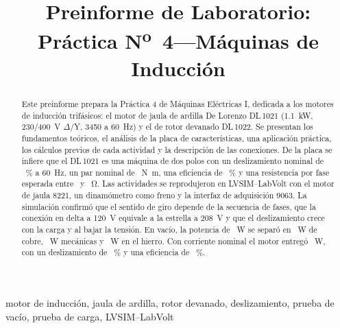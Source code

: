 \documentclass[conference]{IEEEtran}
\begin{document}
\title{Preinforme de Laboratorio: Práctica N\textsuperscript{o}~4---Máquinas de Inducción}

\author{
}

\maketitle

\begin{abstract}
Este preinforme prepara la Práctica 4 de Máquinas Eléctricas I, dedicada a los motores de inducción trifásicos: el motor de jaula de ardilla De Lorenzo DL\,1021 (\SI{1,1}{kW}, \num{230}/\SI{400}{V} $\Delta$/Y, \SI{3450}{\rpm} a \SI{60}{Hz}) y el de rotor devanado DL\,1022. Se presentan los fundamentos teóricos, el análisis de la placa de características, una aplicación práctica, los cálculos previos de cada actividad y la descripción de las conexiones. De la placa se infiere que el DL\,1021 es una máquina de dos polos con un deslizamiento nominal de \DLsSes~\% a \SI{60}{Hz}, un par nominal de \DLTsesenta~\si{N.m}, una eficiencia de \DLetaSes~\% y una resistencia por fase esperada entre \DLRLo\ y \DLRHi~\si{\ohm}. Las actividades se reprodujeron en LVSIM--LabVolt con el motor de jaula 8221, un dinamómetro como freno y la interfaz de adquisición 9063. La simulación confirmó que el sentido de giro depende de la secuencia de fases, que la conexión en delta a \SI{120}{V} equivale a la estrella a \SI{208}{V} y que el deslizamiento crece con la carga y al bajar la tensión. En vacío, la potencia de \PceroNom~\si{W} se separó en \PcuNom~\si{W} de cobre, \Pmec~\si{W} mecánicas y \PfeNom~\si{W} en el hierro. Con corriente nominal el motor entregó \CnomPout~\si{W}, con un deslizamiento de \Cnoms~\% y una eficiencia de \Cnometa~\%.
\end{abstract}

\begin{IEEEkeywords}
motor de inducción, jaula de ardilla, rotor devanado, deslizamiento, prueba de vacío, prueba de carga, LVSIM--LabVolt
\end{IEEEkeywords}

\end{document}
